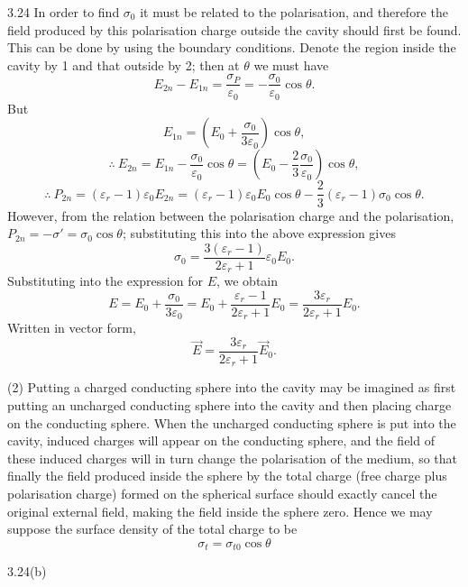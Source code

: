 \begin{solution}{3.24}
In order to find $\sigma_0$ it must be related to the polarisation, and therefore the field produced by this polarisation charge outside the cavity should first be found. This can be done by using the boundary conditions. Denote the region inside the cavity by 1 and that outside by 2; then at $\theta$ we must have
\[
E_{2n}-E_{1n}=\frac{\sigma_P}{\varepsilon_0}=-\frac{\sigma_0}{\varepsilon_0}\cos\theta.
\]
But
\[
E_{1n}=\left(E_0+\frac{\sigma_0}{3\varepsilon_0}\right)\cos\theta,
\]
\[
\therefore\ E_{2n}=E_{1n}-\frac{\sigma_0}{\varepsilon_0}\cos\theta
=\left(E_0-\frac{2}{3}\frac{\sigma_0}{\varepsilon_0}\right)\cos\theta,
\]
\[
\therefore\ P_{2n}=(\varepsilon_r-1)\varepsilon_0E_{2n}
=(\varepsilon_r-1)\varepsilon_0E_0\cos\theta-\frac{2}{3}(\varepsilon_r-1)\sigma_0\cos\theta.
\]
However, from the relation between the polarisation charge and the polarisation, $P_{2n}=-\sigma'=\sigma_0\cos\theta$; substituting this into the above expression gives
\[
\sigma_0=\frac{3(\varepsilon_r-1)}{2\varepsilon_r+1}\varepsilon_0E_0.
\]
Substituting into the expression for $E$, we obtain
\[
E=E_0+\frac{\sigma_0}{3\varepsilon_0}
=E_0+\frac{\varepsilon_r-1}{2\varepsilon_r+1}E_0
=\frac{3\varepsilon_r}{2\varepsilon_r+1}E_0.
\]
Written in vector form,
\begin{equation}
\vec{E}=\frac{3\varepsilon_r}{2\varepsilon_r+1}\vec{E}_0. \tag{1}
\end{equation}

(2) Putting a charged conducting sphere into the cavity may be imagined as first putting an uncharged conducting sphere into the cavity and then placing charge on the conducting sphere. When the uncharged conducting sphere is put into the cavity, induced charges will appear on the conducting sphere, and the field of these induced charges will in turn change the polarisation of the medium, so that finally the field produced inside the sphere by the total charge (free charge plus polarisation charge) formed on the spherical surface should exactly cancel the original external field, making the field inside the sphere zero. Hence we may suppose the surface density of the total charge to be
\[
\sigma_t=\sigma_{t0}\cos\theta
\]

\begin{figbox}{3.24(b)}
\end{figbox}


\end{solution}
